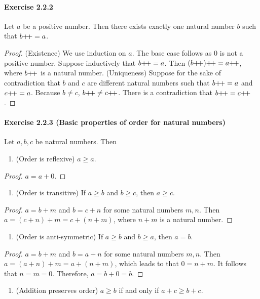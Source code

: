 \paragraph{Exercise 2.2.2} Let $a$ be a positive number. Then there exists exactly one natural number $b$ such that $b{+}{\mkern-3mu}{+} = a$.
\begin{proof}
    (Existence) We use induction on $a$. The base case follows as $0$ is not a positive number. Suppose inductively that $b{+}{\mkern-3mu}{+} = a$. Then $(b{+}{\mkern-3mu}{+}){+}{\mkern-3mu}{+} = a{+}{\mkern-3mu}{+}$, where $b{+}{\mkern-3mu}{+}$ is a natural number.
    (Uniqueness) Suppose for the sake of contradiction that $b$ and $c$ are different natural numbers such that $b{+}{\mkern-3mu}{+} = a$ and $c{+}{\mkern-3mu}{+} =a$. Because $b \neq c$, $b{+}{\mkern-3mu}{+} \neq c{+}{\mkern-3mu}{+}$. There is a contradiction that $b{+}{\mkern-3mu}{+} = c{+}{\mkern-3mu}{+}$.
\end{proof}

\paragraph{Exercise 2.2.3 (Basic properties of order for natural numbers)} Let $a, b, c$ be natural numbers. Then
\begin{enumerate}
    \item (Order is reflexive) $a \geq a$.
\end{enumerate}
\begin{proof}
    $a=a+0$.
\end{proof}
\begin{enumerate}[resume]
    \item (Order is transitive) If $a\geq b$ and $b\geq c$, then $a \geq c$.
\end{enumerate}
\begin{proof}
    $a=b+m$ and $b=c+n$ for some natural numbers $m,n$. Then $a=(c+n)+m=c+(n+m)$, where $n+m$ is a natural number.
\end{proof}
\begin{enumerate}[resume]
    \item (Order is anti-symmetric) If $a \geq b$ and $b \geq a$, then $a = b$.
\end{enumerate}
\begin{proof}
    $a=b+m$ and $b=a+n$ for some natural numbers $m,n$. Then $a=(a+n)+m=a+(n+m)$, which leads to that $0=n+m$. It follows that $n=m=0$. Therefore, $a=b+0=b$.
\end{proof}
\begin{enumerate}[resume]
    \item (Addition preserves order) $a\geq b$ if and only if $a+c\geq b+c$.
\end{enumerate}
